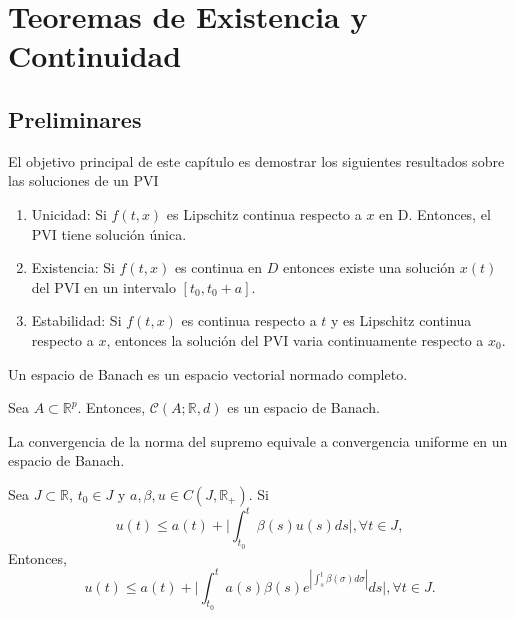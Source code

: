 \chapter{Teoremas de Existencia y Continuidad}

\section{Preliminares}

\begin{note}
  El objetivo principal de este capítulo es demostrar los siguientes resultados sobre las soluciones de un PVI
  \begin{enumerate}[label=(\roman*)]
    \item Unicidad: Si $f(t, x)$ es Lipschitz continua respecto a $x$ en D. Entonces, el PVI tiene solución única.
    \item Existencia: Si $f(t,x)$ es continua en $D$ entonces existe una solución $x(t)$ del PVI en un intervalo $[t_{0} , t_{0} + a]$.
    \item Estabilidad: Si $f(t,x)$ es continua respecto a $t$ y es Lipschitz continua respecto a $x$, entonces la solución del PVI varia continuamente respecto a $x_{0}$.
  \end{enumerate}
\end{note}

\begin{defn}
  Un espacio de Banach es un espacio vectorial normado completo.
\end{defn}

\begin{obs}
  Sea $A \subset \mathbb{R}^{p}$. Entonces, $\mathcal{C}(A; \mathbb{R},d)$ es un espacio de Banach.
\end{obs}

\begin{obs}
  La convergencia de la norma del supremo equivale a convergencia uniforme en un espacio de Banach.
\end{obs}

\begin{lem}
  Sea $J \subset \mathbb{R}$, $t_{0} \in J$ y $a,\beta,u \in C(J,\mathbb{R}_{+})$. Si 
  \[ 
    u(t) \leq a(t) + \Big | \int_{t_{0}}^{t} \beta(s) u(s) ds \Big |, \forall t \in J, 
  \] 
  Entonces,
  \[ 
     u(t) \leq a(t) + \Big | \int_{t_{0}}^{t} a(s) \beta(s) e^{| \int_{s}^{t} \beta(\sigma) d\sigma |} ds \Big |, \forall t \in J.
  \] 
\end{lem}

